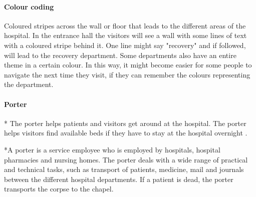 \paragraph{Colour coding}
Coloured stripes across the wall or floor that leads to the different areas of the hospital. In the entrance hall the visitors will see a wall with some lines of text with a coloured stripe behind it. One line might say "recovery" and if followed, will lead to the recovery department. Some departments also have an entire theme in a certain colour. In this way, it might become easier for some people to navigate the next time they visit, if they can remember the colours representing the department. 

\paragraph{Porter}*
The porter helps patients and visitors get around at the hospital. The porter helps visitors find available beds if they have to stay at the hospital overnight \cite{ugd_port}. 

*A porter is a service employee who is employed by hospitals, hospital pharmacies and nursing homes. The porter deals with a wide range of practical and technical tasks, such as transport of patients, medicine, mail and journals between the different hospital departments\cite{ugd_port}. If a patient is dead, the porter transports the corpse to the chapel\cite{int_laila}.

